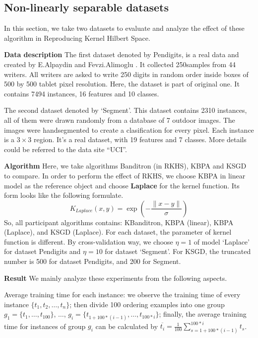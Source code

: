 \documentclass[preprint,12pt,authoryear]{elsarticle}
\begin{document}
\subsection{Non-linearly separable datasets}

In this section, we take two datasets to evaluate and analyze the effect of these algorithm in Reproducing Kernel Hilbert Space.

\vspace{1.5ex}
\textbf{Data description}
The first dataset denoted by Pendigits, is a real data and created by E.Alpaydin and Fevzi.Alimoglu \cite{alimoglu1996combining,Alimoglu96methodsof}. 
It  collected 250samples from 44 writers. All writers are asked to write 250 digits in random order inside boxes of 500 by 500 tablet pixel resolution. 
Here, the dataset is part of original one. It contains 7494 instances, 16 features and 10 classes. 

The second dataset denoted by `Segment'\cite{Lichman:2013}. This dataset contains 2310 instances, all of them were drawn randomly from a database of 7 outdoor images. The images were handsegmented to create a clasification for every pixel. Each instance is a $3\times 3$ region. It's a real dataset, with 19 features and 7 classes. More details could be referred to the data site ``UCI''.

\vspace{1.5ex}
\textbf{Algorithm}
Here, we take algorithms Banditron (in RKHS), KBPA and KSGD to compare. In order to perform the effect of RKHS, we choose KBPA in linear model as the reference object and choose \textbf{Laplace} for the kernel function. Its form looks like the following formulate.
\[K_{Laplace}(x,y) = \exp{\left(-\frac{\parallel{x-y}\parallel}{\sigma}\right)}\]
So, all participant algorithms contains: KBanditron, KBPA (linear), KBPA (Laplace), and KSGD (Laplace). For each dataset, the parameter of kernel function is different. By cross-validation way, we choose $\eta = 1$ of model `Laplace' for dataset Pendigits and $\eta = 10$ for dataset `Segment'. For KSGD, the truncated number is 500 for dataset Pendigits, and 200 for Segment.

\vspace{1.5ex}
\textbf{Result}
We mainly analyze these experiments from the following aspects. 

Average training time for each instance:  we observe the training time of every instance $\{t_1,t_2,\dots,t_n\}$; then divide 100 ordering examples into one group $g_1 = \{t_1,\dots,t_{100}\}$,
$\dots$, $g_i = \{t_{1+100*(i-1)},\dots, t_{100*i}\}$; finally, the average training time for instances of group $g_i$ can be calculated by $\overline{t_i} = \frac{1}{100}\sum_{s=1+100*(i-1)}^{100*i} t_s$. 
\end{document}
